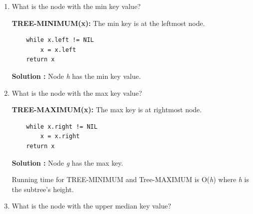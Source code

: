 \documentclass[11pt,fleqn]{book}
\begin{document}
\begin{enumerate}[label=(\Alph*)]
    \item What is the node with the min key value? \\
    \begin{definition}
    \textbf{TREE-MINIMUM(x): } The min key is at the leftmost node. 
    \begin{lstlisting}
    while x.left != NIL
        x = x.left 
    return x
    \end{lstlisting}
    \end{definition}
    \textbf{Solution : } Node \textit{h} has the min key value.
    \item What is the node with the max key value? \\
    \begin{definition}
    \textbf{TREE-MAXIMUM(x): } The max key is at rightmost node.\\
    \begin{lstlisting}
    while x.right != NIL 
        x = x.right 
    return x
    \end{lstlisting}
    \end{definition}
    \textbf{Solution : } Node \textit{g} has the max key. 
    \begin{remark}
    Running time for TREE-MINIMUM and Tree-MAXIMUM is O(\textit{h}) where \textit{h} is the subtree's height. 
    \end{remark}
    \item What is the node with the upper median key value? 
    \begin{definition}
    

\end{definition}
\end{enumerate}
\end{document}
